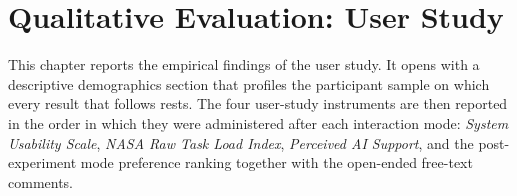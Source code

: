 \chapter{Qualitative Evaluation: User Study}
\label{ch:userstudy}

This chapter reports the empirical findings of the user study. It
opens with a descriptive demographics section that profiles the
participant sample on which every result that follows rests. The
four user-study instruments are then reported in the order in
which they were administered after each interaction mode: \textit{System
Usability Scale}, \textit{NASA Raw Task Load Index}, \textit{Perceived AI Support},
and the post-experiment mode preference ranking together with the
open-ended free-text comments.







